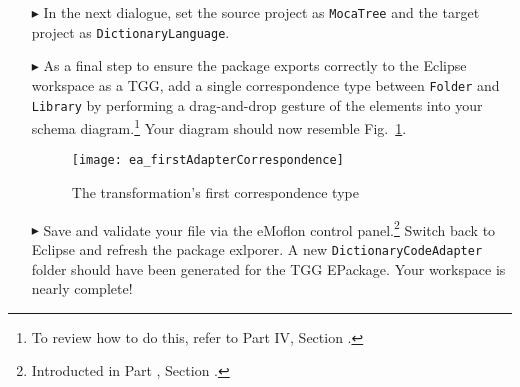\begin{itemize}

\item[$\blacktriangleright$] In the next dialogue, set the source project as \texttt{MocaTree} and the target project as \texttt{Dict\-ion\-ary\-Lang\-uage}.

\item[$\blacktriangleright$] As a final step to ensure the package exports correctly to the Eclipse workspace as a TGG, add a single correspondence type between
\texttt{Folder} and \texttt{Library} by performing a drag-and-drop gesture of the elements into your schema diagram.\footnote{To review how to do this, refer to
Part IV, Section \update.} Your diagram should now resemble Fig.~\ref{ea:firstCorrType}.

\vspace{0.5cm}

\begin{figure}[htpb]
\begin{center}
  \texttt{[image: ea\_firstAdapterCorrespondence]}
  \caption{The transformation's first correspondence type}
  \label{ea:firstCorrType}
\end{center}
\end{figure}

\item[$\blacktriangleright$] Save and validate your file via the eMoflon control panel.\footnote{Introducted in Part \update, Section \update.} Switch back
to Eclipse and refresh the package exlporer. A new \texttt{Dict\-ion\-ary\-Code\-Adap\-ter} folder should have been generated for the TGG EPackage. Your
workspace is nearly complete!


\end{itemize}
